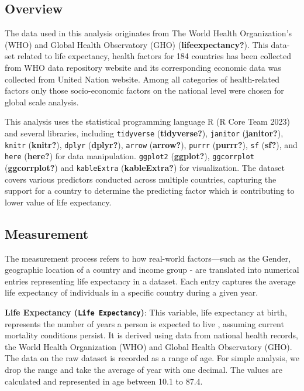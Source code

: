 \documentclass[
  letterpaper,
  DIV=11,
  numbers=noendperiod]{scrartcl}
\begin{document}
\subsection{Overview}\label{overview}

The data used in this analysis originates from The World Health
Organization's (WHO) and Global Health Observatory (GHO)
(\textbf{lifeexpectancy?}). This data-set related to life expectancy,
health factors for 184 countries has been collected from WHO data
repository website and its corresponding economic data was collected
from United Nation website. Among all categories of health-related
factors only those socio-economic factors on the national level were
chosen for global scale analysis.

This analysis uses the statistical programming language R (R Core Team
2023) and several libraries, including \texttt{tidyverse}
(\textbf{tidyverse?}), \texttt{janitor} (\textbf{janitor?}),
\texttt{knitr} (\textbf{knitr?}), \texttt{dplyr} (\textbf{dplyr?}),
\texttt{arrow} (\textbf{arrow?}), \texttt{purrr} (\textbf{purrr?}),
\texttt{sf} (\textbf{sf?}), and \texttt{here} (\textbf{here?}) for data
manipulation. \texttt{ggplot2} (\textbf{ggplot?}), \texttt{ggcorrplot}
(\textbf{ggcorrplot?}) and \texttt{kableExtra} (\textbf{kableExtra?})
for visualization. The dataset covers various predictors conducted
across multiple countries, capturing the support for a country to
determine the predicting factor which is contributing to lower value of
life expectancy.

\subsection{Measurement}\label{measurement}

The measurement process refers to how real-world factors---such as the
Gender, geographic location of a country and income group - are
translated into numerical entries representing life expectancy in a
dataset. Each entry captures the average life expectancy of individuals
in a specific country during a given year.

\textbf{Life Expectancy (\texttt{Life\ Expectancy})}: This variable,
life expectancy at birth, represents the number of years a person is
expected to live , assuming current mortality conditions persist. It is
derived using data from national health records, the World Health
Organization (WHO) and Global Health Observatory (GHO). The data on the
raw dataset is recorded as a range of age. For simple analysis, we drop
the range and take the average of year with one decimal. The values are
calculated and represented in age between 10.1 to 87.4.
\end{document}
